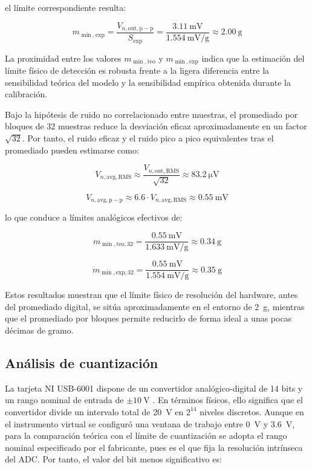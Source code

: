 el límite correspondiente resulta:

\[
    m_{\min,\mathrm{exp}} = \frac{V_{n,\mathrm{out,p-p}}}{S_{\mathrm{exp}}}
    = \frac{\SI{3.11}{\milli\V}}{\SI{1.554}{\milli\V\per\g}}
    \approx \SI{2.00}{\g}
\]

La proximidad entre los valores $m_{\min,\mathrm{teo}}$ y $m_{\min,\mathrm{exp}}$ indica que la estimación del límite físico de detección es robusta frente a la ligera diferencia entre la sensibilidad teórica del modelo y la sensibilidad empírica obtenida durante la calibración.

Bajo la hipótesis de ruido no correlacionado entre muestras, el promediado por bloques de 32 muestras reduce la desviación eficaz aproximadamente en un factor $\sqrt{32}$. Por tanto, el ruido eficaz y el ruido pico a pico equivalentes tras el promediado pueden estimarse como:

\[
    V_{n,\mathrm{avg,RMS}} \approx \frac{V_{n,\mathrm{out,RMS}}}{\sqrt{32}}
    \approx \SI{83.2}{\micro\V}
\]

\[
    V_{n,\mathrm{avg,p-p}} \approx 6.6 \cdot V_{n,\mathrm{avg,RMS}}
    \approx \SI{0.55}{\milli\V}
\]

lo que conduce a límites analógicos efectivos de:

\[
    m_{\min,\mathrm{teo,32}} = \frac{\SI{0.55}{\milli\V}}{\SI{1.633}{\milli\V\per\g}}
    \approx \SI{0.34}{\g}
\]

\[
    m_{\min,\mathrm{exp,32}} = \frac{\SI{0.55}{\milli\V}}{\SI{1.554}{\milli\V\per\g}}
    \approx \SI{0.35}{\g}
\]

Estos resultados muestran que el límite físico de resolución del hardware, antes del promediado digital, se sitúa aproximadamente en el entorno de \SI{2}{\g}, mientras que el promediado por bloques permite reducirlo de forma ideal a unas pocas décimas de gramo.

\subsection{Análisis de cuantización}

La tarjeta NI USB-6001 dispone de un convertidor analógico-digital de 14 bits y un rango nominal de entrada de $\pm\SI{10}{\V}$ \cite{ni6001_datasheet}. En términos físicos, ello significa que el convertidor divide un intervalo total de \SI{20}{\V} en $2^{14}$ niveles discretos. Aunque en el instrumento virtual se configuró una ventana de trabajo entre \SI{0}{\V} y \SI{3.6}{\V}, para la comparación teórica con el límite de cuantización se adopta el rango nominal especificado por el fabricante, pues es el que fija la resolución intrínseca del ADC. Por tanto, el valor del bit menos significativo es:

